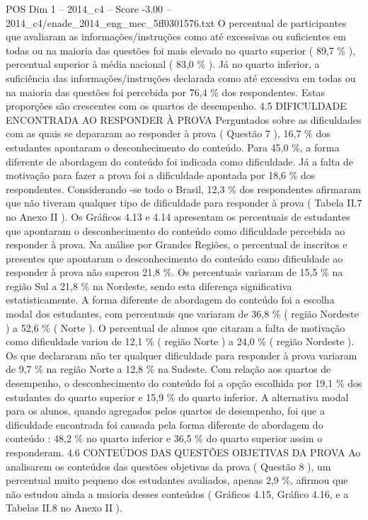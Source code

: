 \begin{textsample}{POS Dim 1 – 2014\_c4 – Score -3.00 – 2014\_c4/enade\_2014\_eng\_mec\_5ff0301576.txt}
O percentual de participantes que avaliaram as informações/instruções como até excessivas ou suficientes em todas ou na maioria das questões foi mais elevado no quarto superior ( 89,7 \% ), percentual superior à média nacional ( 83,0 \% ).
Já no quarto inferior, a suficiência das informações/instruções declarada como até excessiva em todas ou na maioria das questões foi percebida por 76,4 \% dos respondentes.
Estas proporções são crescentes com os quartos de desempenho. 4.5 DIFICULDADE ENCONTRADA AO RESPONDER À PROVA Perguntados sobre as dificuldades com as quais se depararam ao responder à prova ( Questão 7 ), 16,7 \% dos estudantes apontaram o desconhecimento do conteúdo.
Para 45,0 \%, a forma diferente de abordagem do conteúdo foi indicada como dificuldade.
Já a falta de motivação para fazer a prova foi a dificuldade apontada por 18,6 \% dos respondentes.
Considerando -se todo o Brasil, 12,3 \% dos respondentes afirmaram que não tiveram qualquer tipo de dificuldade para responder à prova ( Tabela II.7 no Anexo II ).
Os Gráficos 4.13 e 4.14 apresentam os percentuais de estudantes que apontaram o desconhecimento do conteúdo como dificuldade percebida ao responder à prova.
Na análise por Grandes Regiões, o percentual de inscritos e presentes que apontaram o desconhecimento do conteúdo como dificuldade ao responder à prova não superou 21,8 \%.
Os percentuais variaram de 15,5 \% na região Sul a 21,8 \% na Nordeste, sendo esta diferença significativa estatisticamente.
A forma diferente de abordagem do conteúdo foi a escolha modal dos estudantes, com percentuais que variaram de 36,8 \% ( região Nordeste ) a 52,6 \% ( Norte ).
O percentual de alunos que citaram a falta de motivação como dificuldade variou de 12,1 \% ( região Norte ) a 24,0 \% ( região Nordeste ).
Os que declararam não ter qualquer dificuldade para responder à prova variaram de 9,7 \% na região Norte a 12,8 \% na Sudeste.
Com relação aos quartos de desempenho, o desconhecimento do conteúdo foi a opção escolhida por 19,1 \% dos estudantes do quarto superior e 15,9 \% do quarto inferior.
A alternativa modal para os alunos, quando agregados pelos quartos de desempenho, foi que a dificuldade encontrada foi causada pela forma diferente de abordagem do conteúdo : 48,2 \% no quarto inferior e 36,5 \% do quarto superior assim o responderam. 4.6 CONTEÚDOS DAS QUESTÕES OBJETIVAS DA PROVA Ao analisarem os conteúdos das questões objetivas da prova ( Questão 8 ), um percentual muito pequeno dos estudantes avaliados, apenas 2,9 \%, afirmou que não estudou ainda a maioria desses conteúdos ( Gráficos 4.15, Gráfico 4.16, e a Tabelas II.8 no Anexo II ).

\end{textsample}
